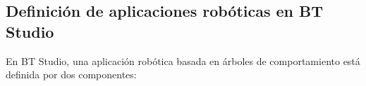 


\subsection{Definición de aplicaciones robóticas en BT Studio}

En BT Studio, una aplicación robótica basada en árboles de comportamiento está definida por dos componentes: 

